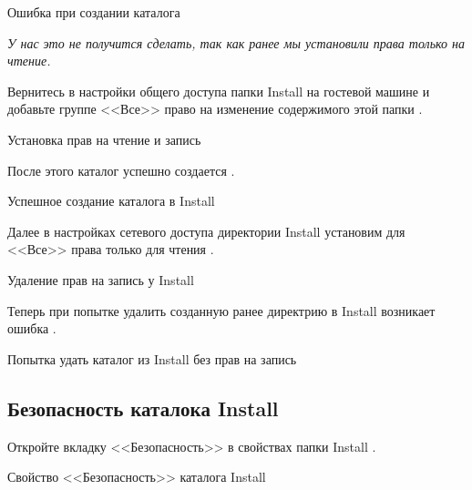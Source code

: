\begin{image}
	\caption{Ошибка при создании каталога}
	\label{fig:dir:inst:r:create:folder:error}
\end{image}

\textit{У нас это не получится сделать,
так как ранее мы установили права только на чтение.}

Вернитесь в настройки общего доступа папки Install на гостевой машине
и добавьте группе <<Все>> право на изменение содержимого этой папки
.

\begin{image}
	\caption{Установка прав на чтение и запись}
	\label{fig:dir:inst:rw}
\end{image}

После этого каталог успешно создается .

\begin{image}
	\caption{Успешное создание каталога в Install}
	\label{fig:dir:inst:rw:create:folder}
\end{image}

Далее в настройках сетевого доступа директории Install
установим для <<Все>> права только для чтения .

\begin{image}
	\caption{Удаление прав на запись у Install}
	\label{fig:dir:inst:r:2}
\end{image}

Теперь при попытке удалить созданную ранее директрию в Install
возникает ошибка .

\begin{image}
	\caption{Попытка удать каталог из Install без прав на запись}
	\label{fig:dir:inst:r:2:error}
\end{image}

\subsection{Безопасность каталока Install}

Откройте вкладку <<Безопасность>> в свойствах папки Install
.

\begin{image}
	\caption{Свойство <<Безопасность>> каталога Install}
	\label{fig:dir:satery}
\end{image}

